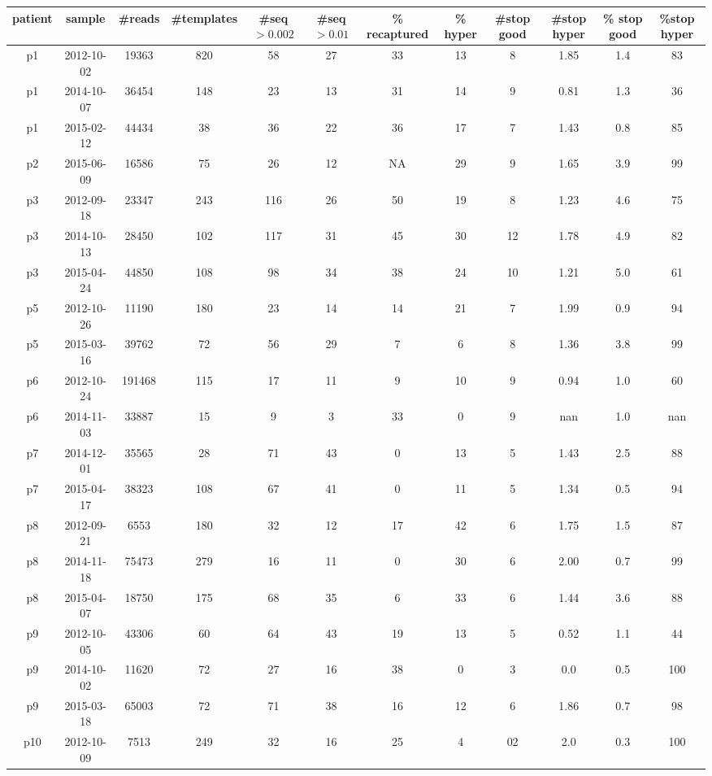 \documentclass[aps,rmp,onecolumn,linenumbers]{revtex4-1}
\begin{document}
\begin{table}
\scriptsize
\centering
\begin{tabular}{|cccc|ccc|ccc|cc|}\hline
patient & sample & \#reads & \#templates & \#seq$>0.002$ & \#seq$>0.01$ & \% recaptured & \% hyper & \#stop good& \#stop hyper& \% stop good& \%stop hyper\\ \hline
p1 & 2012-10-02 & 19363 & 820 & 58 & 27 & 33 & 13 & 8 & 1.85 & 1.4 & 83\\
p1 & 2014-10-07 & 36454 & 148 & 23 & 13 & 31 & 14 & 9 & 0.81 & 1.3 & 36\\
p1 & 2015-02-12 & 44434 & 38 & 36 & 22 & 36 & 17 & 7 & 1.43 & 0.8 & 85\\
p2 & 2015-06-09 & 16586 & 75 & 26 & 12 & NA & 29 & 9 & 1.65 & 3.9 & 99\\
p3 & 2012-09-18 & 23347 & 243 & 116 & 26 & 50 & 19 & 8 & 1.23 & 4.6 & 75\\
p3 & 2014-10-13 & 28450 & 102 & 117 & 31 & 45 & 30 & 12 & 1.78 & 4.9 & 82\\
p3 & 2015-04-24 & 44850 & 108 & 98 & 34 & 38 & 24 & 10 & 1.21 & 5.0 & 61\\
p5 & 2012-10-26 & 11190 & 180 & 23 & 14 & 14 & 21 & 7 & 1.99 & 0.9 & 94\\
p5 & 2015-03-16 & 39762 & 72 & 56 & 29 & 7 & 6 & 8 & 1.36 & 3.8 & 99\\
p6 & 2012-10-24 & 191468 & 115 & 17 & 11 & 9 & 10 & 9 & 0.94 & 1.0 & 60\\
p6 & 2014-11-03 & 33887 & 15 & 9 & 3 & 33 & 0 & 9 & nan & 1.0 & nan\\
p7 & 2014-12-01 & 35565 & 28 & 71 & 43 & 0 & 13 & 5 & 1.43 & 2.5 & 88\\
p7 & 2015-04-17 & 38323 & 108 & 67 & 41 & 0 & 11 & 5 & 1.34 & 0.5 & 94\\
p8 & 2012-09-21 & 6553 & 180 & 32 & 12 & 17 & 42 & 6 & 1.75 & 1.5 & 87\\
p8 & 2014-11-18 & 75473 & 279 & 16 & 11 & 0 & 30 & 6 & 2.00 & 0.7 & 99\\
p8 & 2015-04-07 & 18750 & 175 & 68 & 35 & 6 & 33 & 6 & 1.44 & 3.6 & 88\\
p9 & 2012-10-05 & 43306 & 60 & 64 & 43 & 19 & 13 & 5 & 0.52 & 1.1 & 44\\
p9 & 2014-10-02 & 11620 & 72 & 27 & 16 & 38 & 0 & 3 & 0.0 & 0.5 & 100\\
p9 & 2015-03-18 & 65003 & 72 & 71 & 38 & 16 & 12 & 6 & 1.86 & 0.7 & 98\\
p10 & 2012-10-09 & 7513 & 249 & 32 & 16 & 25 & 4 & 02 & 2.0 & 0.3 & 100\\

\end{tabular}
\end{table}
\end{document}
